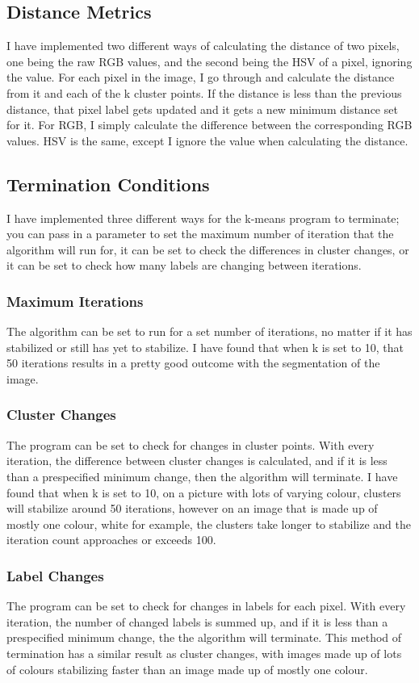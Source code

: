 \documentclass{article}
\begin{document}
\subsection{Distance Metrics}
I have implemented two different ways of calculating the distance of two pixels,
one being the raw RGB values, and the second being the HSV of a pixel, ignoring
the value. For each pixel in the image, I go through and calculate the distance
from it and each of the k cluster points. If the distance is less than the
previous distance, that pixel label gets updated and it gets a new minimum
distance set for it. For RGB, I simply calculate the difference between the
corresponding RGB values. HSV is the same, except I ignore the value when
calculating the distance.

\subsection{Termination Conditions}
I have implemented three different ways for the k-means program to terminate;
you can pass in a parameter to set the maximum number of iteration that the
algorithm will run for, it can be set to check the differences in cluster
changes, or it can be set to check how many labels are changing between
iterations.

\subsubsection{Maximum Iterations}
The algorithm can be set to run for a set number of iterations, no matter if it
has stabilized or still has yet to stabilize. I have found that when k is set to
10, that 50 iterations results in a pretty good outcome with the segmentation of
the image.

\subsubsection{Cluster Changes}
The program can be set to check for changes in cluster points. With every
iteration, the difference between cluster changes is calculated, and if it is
less than a prespecified minimum change, then the algorithm will terminate. I
have found that when k is set to 10, on a picture with lots of varying colour,
clusters will stabilize around 50 iterations, however on an image that is made
up of mostly one colour, white for example, the clusters take longer to
stabilize and the iteration count approaches or exceeds 100.

\subsubsection{Label Changes}
The program can be set to check for changes in labels for each pixel. With every
iteration, the number of changed labels is summed up, and if it is less than a
prespecified minimum change, the the algorithm will terminate. This method of
termination has a similar result as cluster changes, with images made up of lots
of colours stabilizing faster than an image made up of mostly one colour.
\end{document}
